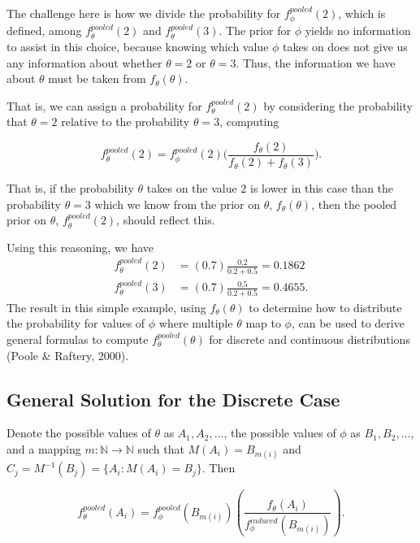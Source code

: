 \documentclass[12pt,twoside]{smiththesis}
\begin{document}
The challenge here is how we divide the probability for \(f_\phi^{pooled}(2)\), which is defined, among \(f_\theta^{pooled}(2)\) and \(f_\theta^{pooled}(3)\). The prior for \(\phi\) yields no information to assist in this choice, because knowing which value \(\phi\) takes on does not give us any information about whether \(\theta=2\) or \(\theta=3\). Thus, the information we have about \(\theta\) must be taken from \(f_\theta(\theta)\).

That is, we can assign a probability for \(f_\theta^{pooled}(2)\) by considering the probability that \(\theta = 2\) relative to the probability \(\theta =3\), computing

\[f_\theta^{pooled}(2) = f_\phi^{pooled}(2) \Big( \frac{f_\theta(2)}{f_\theta(2) + f_\theta(3)}\Big).\]

That is, if the probability \(\theta\) takes on the value \(2\) is lower in this case than the probability \(\theta=3\) which we know from the prior on \(\theta\), \(f_\theta(\theta)\), then the pooled prior on \(\theta\), \(f_\theta^{pooled}(2)\), should reflect this.

Using this reasoning, we have
\begin{align*} f_\theta^{pooled}(2) &= (0.7) \frac{0.2}{0.2+0.5} = 0.1862\\
f_\theta^{pooled}(3) &= (0.7) \frac{0.5}{0.2+0.5} = 0.4655.
\end{align*}
The result in this simple example, using \(f_\theta(\theta)\) to determine how to distribute the probability for values of \(\phi\) where multiple \(\theta\) map to \(\phi\), can be used to derive general formulas to compute \(f_\theta^{pooled}(\theta)\) for discrete and continuous distributions (Poole \& Raftery, 2000).

\hypertarget{general-solution-for-the-discrete-case}{%
\subsection{General Solution for the Discrete Case}\label{general-solution-for-the-discrete-case}}

Denote the possible values of \(\theta\) as \(A_1, A_2, \dots\), the possible values of \(\phi\) as \(B_1, B_2, \dots\), and a mapping \(m: \mathbb{N} \to \mathbb{N}\) such that \(M(A_i) = B_{m(i)}\) and \(C_j = M^{-1}(B_j) = \{A_i : M(A_i) = B_j\}\). Then

\[f_\theta^{pooled}(A_i) = f_\phi^{pooled}(B_{m(i)}) \left( \frac{f_\theta(A_i)}{f_\phi^{induced}(B_{m(i)})} \right).\]
\end{document}
